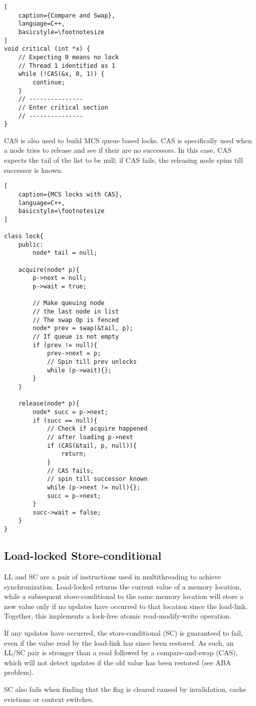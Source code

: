 \documentclass{article}
\begin{document}
\begin{multicols*}{2}
\begin{lstlisting}[
    caption={Compare and Swap},
    language=C++, 
    basicstyle=\footnotesize
]
void critical (int *x) {
    // Expecting 0 means no lock
    // Thread 1 identified as 1
    while (!CAS(&x, 0, 1)) {
        continue;
    }
    // ---------------
    // Enter critical section
    // ---------------
}
\end{lstlisting}

\medskip\par\noindent
CAS is also used to build MCS queue based locks. CAS is specifically used when a node tries to release and see if their are no successors. In this case, CAS expects the tail of the list to be null; if CAS fails, the releasing node spins till successor is known.

\begin{lstlisting}[
    caption={MCS locks with CAS},
    language=C++, 
    basicstyle=\footnotesize
]

class lock{
    public:
        node* tail = null;
    
    acquire(node* p){
        p->next = null;
        p->wait = true;
        
        // Make queuing node
        // the last node in list
        // The swap Op is fenced
        node* prev = swap(&tail, p);
        // If queue is not empty
        if (prev != null){
            prev->next = p;
            // Spin till prev unlocks
            while (p->wait){};
        }
    }
    
    release(node* p){
        node* succ = p->next;
        if (succ == null){
            // Check if acquire happened
            // after loading p->next
            if (CAS(&tail, p, null)){
                return;
            }
            // CAS fails;
            // spin till successor known
            while (p->next != null){};
            succ = p->next;
        }
        succ->wait = false;
    }
}

\end{lstlisting}

\subsection{Load-locked Store-conditional}
LL and SC are a pair of instructions used in multithreading to achieve synchronization. Load-locked returns the current value of a memory location, while a subsequent store-conditional to the same memory location will store a new value only if no updates have occurred to that location since the load-link. Together, this implements a lock-free atomic read-modify-write operation.
\medskip\par\noindent
If any updates have occurred, the store-conditional (SC) is guaranteed to fail, even if the value read by the load-link has since been restored. As such, an LL/SC pair is stronger than a read followed by a compare-and-swap (CAS), which will not detect updates if the old value has been restored (see ABA problem).
\medskip\par\noindent
SC also fails when finding that the flag is cleared caused by invalidation, cache evictions or context switches.


\end{multicols*}
\end{document}
